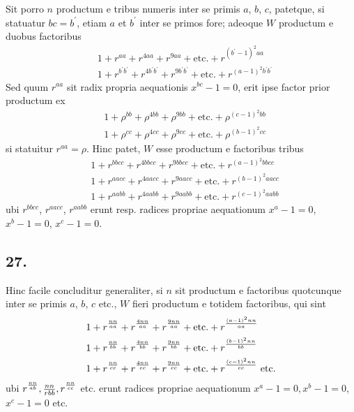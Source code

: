 \documentclass[twoside,12pt, showframe]{memoir}
\let\oldfrac\frac
\def\frac#1#2{\mathchoice{\tfrac{#1}{#2}}{\oldfrac{#1}{#2}}{\genfrac{}{}{}{2}{#1}{#2\mathstrut}}{\genfrac{}{}{}{3}{#1}{#2\mathstrut}}}
\begin{document}
Sit porro \(n\) productum e tribus numeris inter se primis \(a\), \(b\), \(c\), patetque, si statuatur \(b c=b^{\prime}\), etiam \(a\) et \(b^{\prime}\) inter se primos fore; adeoque \(W\) productum e duobus factoribus
\[\begin{aligned}
& 1+r^{a a}+r^{4 a a}+r^{9 a a}+\text{etc.}+r^{(b^{\prime}-1)^{2} a a} \\
& 1+r^{b^{\prime} b^{\prime}}+r^{4 b^{\prime} b^{\prime}}+r^{9 b^{\prime} b^{\prime}}+\text{etc.}+r^{(a-1)^{2} b^{\prime} b^{\prime}}
\end{aligned}\]
Sed quum \(r^{a a}\) sit radix propria aequationis \(x^{b c}-1=0\), erit ipse factor prior productum ex
\[\begin{aligned}
& 1+\rho^{b b}+\rho^{4 b b}+\rho^{9 b b}+\text{etc.}+\rho^{(c-1)^{2} b b} \\
& 1+\rho^{c c}+\rho^{4 c c}+\rho^{9 c c}+\text{etc.}+\rho^{(b-1)^{2} c c}
\end{aligned}\]
si statuitur \(r^{a a}=\rho\). Hinc patet, \(W\) esse productum e factoribus tribus
\[\begin{aligned}
& 1+r^{b b c c}+r^{4 b b c c}+r^{9 b b c c}+\text{etc.}+r^{(a-1)^{2} b b c c} \\
& 1+r^{a a c c}+r^{4 a a c c}+r^{9 a a c c}+\text{etc.}+r^{(b-1)^{2} a a c c} \\
& 1+r^{a a b b}+r^{4 a a b b}+r^{9 a a b b}+\text{etc.}+r^{(c-1)^{2} a a b b}
\end{aligned}\]
ubi \(r^{b b c c}\), \(r^{a a c c}\), \(r^{a a b b}\) erunt resp. radices propriae aequationum \(x^{a}-1=0\), \(x^{b}-1=0\), \(x^{c}-1=0\).

\subsection*{27.}
 
Hinc facile concluditur generaliter, si \(n\) sit productum e factoribus quotcunque inter se primis \(a\), \(b\), \(c\) etc., \(W\) fieri productum e totidem factoribus, qui sint
\[\begin{aligned}
& 1+r^{\frac{n n}{a a}}+r^{\frac{4 n n}{a a}}+r^{\frac{9 n n}{a a}}+\text{etc.}+r^{\frac{(a-1)^{2} n n}{a a}} \\
& 1+r^{\frac{n n}{b b}}+r^{\frac{4 n n}{b b}}+r^{\frac{9 n n}{b b}}+\text{etc.}+r^{\frac{(b-1)^{2} n n}{b b}} \\
& 1+r^{\frac{n n}{c c}}+r^{\frac{4 n n}{c c}}+r^{\frac{9 n n}{c c}}+\text{etc.}+r^{\frac{(c-1)^{2} n n}{c c}} \text{ etc.}
\end{aligned}\]
ubi \(r^{\frac{n n}{a b}}, \frac{n n}{r b b}, r^{\frac{n n}{c c}}\) etc. erunt radices propriae aequationum \(x^{a}-1=0, x^{b}-1=0\), \(x^{c}-1=0\) etc.
\end{document}
